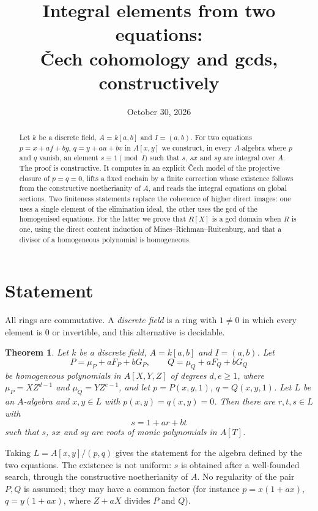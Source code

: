 \documentclass[11pt]{amsart}
\title{Integral elements from two equations:\\ \v{C}ech cohomology and gcds, constructively}
\date{October 30, 2026}
\newtheorem{theorem}{Theorem}[section]
\theoremstyle{definition}
\theoremstyle{remark}
\begin{document}
\begin{abstract}
Let $k$ be a discrete field, $A=k[a,b]$ and $I=(a,b)$. For two equations
$p=x+af+bg$, $q=y+au+bv$ in $A[x,y]$ we construct, in every $A$-algebra
where $p$ and $q$ vanish, an element $s\equiv1\pmod I$ such that $s$, $sx$
and $sy$ are integral over $A$. The proof is constructive. It computes in an
explicit \v{C}ech model of the projective closure of $p=q=0$, lifts a fixed
cochain by a finite correction whose existence follows from the constructive
noetherianity of $A$, and reads the integral equations on global sections.
Two finiteness statements replace the coherence of higher direct images: one
uses a single element of the elimination ideal, the other uses the gcd of
the homogenised equations. For the latter we prove that $R[X]$ is a gcd
domain when $R$ is one, using the direct content induction of
Mines--Richman--Ruitenburg, and that a divisor of a homogeneous polynomial
is homogeneous.
\end{abstract}
\maketitle

\section{Statement}

All rings are commutative. A \emph{discrete field} is a ring with $1\ne0$ in
which every element is $0$ or invertible, and this alternative is decidable.

\begin{theorem}\label{thm:main}
Let $k$ be a discrete field, $A=k[a,b]$ and $I=(a,b)$. Let
\[
 P=\mu_P+aF_P+bG_P,\qquad Q=\mu_Q+aF_Q+bG_Q
\]
be homogeneous polynomials in $A[X,Y,Z]$ of degrees $d,e\ge1$, where
$\mu_P=XZ^{d-1}$ and $\mu_Q=YZ^{e-1}$, and let $p=P(x,y,1)$,
$q=Q(x,y,1)$. Let $L$ be an $A$-algebra and $x,y\in L$ with
$p(x,y)=q(x,y)=0$. Then there are $r,t,s\in L$ with
\[
 s=1+ar+bt
\]
such that $s$, $sx$ and $sy$ are roots of monic polynomials in $A[T]$.
\end{theorem}

Taking $L=A[x,y]/(p,q)$ gives the statement for the algebra defined by the
two equations. The existence is not uniform: $s$ is obtained after a
well-founded search, through the constructive noetherianity of $A$.
No regularity of the pair $P,Q$ is assumed; they may have a common factor
(for instance $p=x(1+ax)$, $q=y(1+ax)$, where $Z+aX$ divides $P$ and $Q$).
\end{document}
